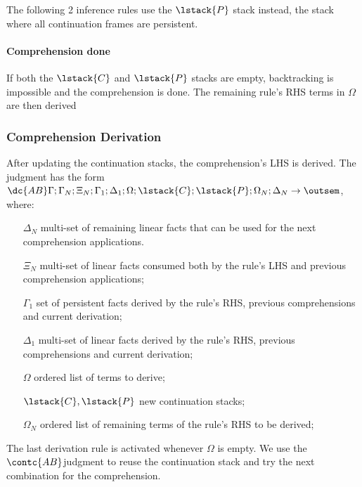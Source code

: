 The following 2 inference rules use the $\lstack{P}$ stack instead, the stack where all
continuation frames are persistent.



\paragraph{Comprehension done}

If both the $\lstack{C}$ and $\lstack{P}$ stacks are empty, backtracking is
impossible and the comprehension is done. The remaining rule's RHS terms in
$\Omega$ are then derived



\subsubsection{Comprehension Derivation}

After updating the continuation stacks, the comprehension's LHS is derived. The
judgment has the form $\dc{AB} \Gamma; \Gamma_N; \Xi_N; \Gamma_1; \Delta_1;
\Omega; \lstack{C}; \lstack{P}; \Omega_N; \Delta_N \rightarrow \outsem$, where:

\begin{enumerate}
   \item[$\Delta_N$] multi-set of remaining linear facts that can be used for
   the next comprehension applications.

   \item[$\Xi_N$] multi-set of linear facts consumed both by the rule's LHS and
      previous comprehension applications;

   \item[$\Gamma_1$] set of persistent facts derived by the rule's RHS, previous
      comprehensions and current derivation;

   \item[$\Delta_1$] multi-set of linear facts derived by the rule's RHS,
      previous comprehensions and current derivation;

   \item[$\Omega$] ordered list of terms to derive;
   \item[$\lstack{C}, \lstack{P}$] new continuation stacks;

   \item[$\Omega_N$] ordered list of remaining terms of the rule's RHS to be
      derived;

\end{enumerate}



The last derivation rule is activated whenever $\Omega$ is empty. We use the
$\contc{AB}$judgment to reuse the continuation stack
and try the next combination for the comprehension.


